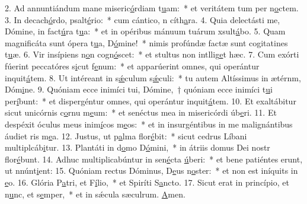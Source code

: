 2. Ad annuntiándum mane miseric\uline{ó}rdiam t\uline{u}am:~* et veritátem tum per n\uline{o}ctem.
3. In decach\uline{ó}rdo, psalt\uline{é}rio:~* cum cántico, n cíth\uline{a}ra.
4. Quia delectásti me, Dómine, in fact\uline{ú}ra t\uline{u}a:~* et in opéribus mánuum tuárum xsult\uline{á}bo.
5. Quam magnificáta sunt ópera t\uline{u}a, D\uline{ó}mine!~* nimis profúndæ factæ sunt cogitatines t\uline{u}æ.
6. Vir insípiens n\uline{o}n cogn\uline{ó}scet:~* et stultus non intllig\uline{e}t hæc.
7. Cum exórti fúerint peccatóres s\uline{i}cut f\uline{e}num:~* et apparúerint omnes, qui operántur inquit\uline{á}tem.
8. Ut intéreant in s\uline{ǽ}culum s\uline{ǽ}culi:~* tu autem Altíssimus in ætérnm, Dóm\uline{i}ne.
9. Quóniam ecce inimíci tui, Dómine,~† quóniam ecce inimíci t\uline{u}i per\uline{í}bunt:~* et dispergéntur omnes, qui operántur inquit\uline{á}tem.
10. Et exaltábitur sicut unicórnis c\uline{o}rnu m\uline{e}um:~* et senéctus mea in misericórdi úb\uline{e}ri.
11. Et despéxit óculus meus inim\uline{í}cos m\uline{e}os:~* et in insurgéntibus in me malignántibus áudiet ris m\uline{e}a.
12. Justus, ut p\uline{a}lma flor\uline{é}bit:~* sicut cedrus Líbani multiplcáb\uline{i}tur.
13. Plantáti in d\uline{o}mo D\uline{ó}mini,~* in átriis domus Dei nostr flor\uline{é}bunt.
14. Adhuc multiplicabúntur in sen\uline{é}cta \uline{ú}beri:~* et bene patiéntes erunt, ut nnúnt\uline{i}ent:
15. Quóniam rectus Dóminus, D\uline{e}us n\uline{o}ster:~* et non est iníquits in \uline{e}o.
16. Glória P\uline{a}tri, et F\uline{í}lio,~* et Spiríti S\uline{a}ncto.
17. Sicut erat in princípio, et n\uline{u}nc, et s\uline{e}mper,~* et in sǽcula sæculrum. \uline{A}men.
